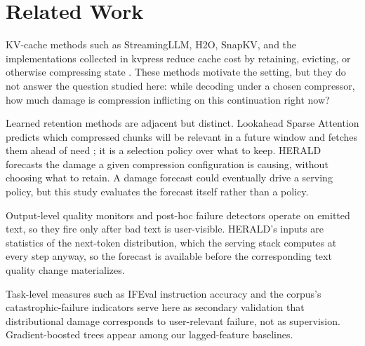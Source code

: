 \section{Related Work}

KV-cache methods such as StreamingLLM, H2O, SnapKV, and the implementations
collected in kvpress reduce cache cost by retaining, evicting, or otherwise
compressing state \citep{streamingllm,h2o,snapkv,kvpress}. These methods
motivate the setting, but they do not answer the question studied here: while
decoding under a chosen compressor, how much damage is compression inflicting
on this continuation right now?

Learned retention methods are adjacent but distinct. Lookahead Sparse
Attention predicts which compressed chunks will be relevant in a future
window and fetches them ahead of need \citep{lsa}; it is a selection policy
over what to keep. HERALD forecasts the damage a given compression
configuration is causing, without choosing what to retain. A damage forecast
could eventually drive a serving policy, but this study evaluates the
forecast itself rather than a policy.

Output-level quality monitors and post-hoc failure detectors operate on
emitted text, so they fire only after bad text is user-visible. HERALD's
inputs are statistics of the next-token distribution, which the serving stack
computes at every step anyway, so the forecast is available before the
corresponding text quality change materializes.

Task-level measures such as IFEval instruction accuracy \citep{ifeval} and
the corpus's catastrophic-failure indicators serve here as secondary
validation that distributional damage corresponds to user-relevant failure,
not as supervision. Gradient-boosted trees \citep{xgboost} appear among our
lagged-feature baselines.
